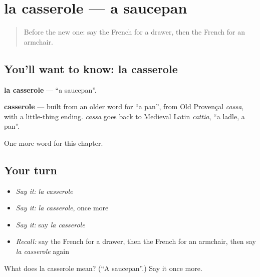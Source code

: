 \section[la casserole]{la casserole — a saucepan}

\label{lesson:FR-C193-casserole}



\begin{quote}
Before the new one: say the French for a drawer, then the French for an armchair.
\end{quote}

\subsection*{You'll want to know: la casserole}
\textbf{la casserole} — \textquotedblleft{}a saucepan\textquotedblright{}.

\begin{cousinweb}
\textbf{casserole} — built from an older word for \textquotedblleft{}a pan\textquotedblright{}, from Old Provençal \emph{cassa}, with a little-thing ending. \emph{cassa} goes back to Medieval Latin \emph{cattia}, \textquotedblleft{}a ladle, a pan\textquotedblright{}.
\end{cousinweb}

\begin{grammarlens}[title={What you've built}]
One more word for this chapter.
\end{grammarlens}

\subsection*{Your turn}
\begin{itemize}
\raggedright
  \item \emph{Say it:} \emph{la casserole}
  \item \emph{Say it:} \emph{la casserole}, once more
  \item \emph{Say it:} say \emph{la casserole}
  \item \emph{Recall:} say the French for a drawer, then the French for an armchair, then say \emph{la casserole} again
\end{itemize}

\begin{tcolorbox}[breakable,colback=teal!4,colframe=teal!35!black,title={Before you move on}]
What does la casserole mean? (\textquotedblleft{}A saucepan\textquotedblright{}.) Say it once more.
\end{tcolorbox}
